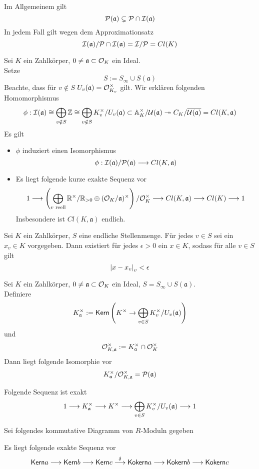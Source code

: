 \documentclass{book}
\renewcommand{\A}{\mathbb{A}}
\newcommand{\af}{\mathfrak{a}}
\begin{document}
\Bem{}
Im Allgemeinem gilt
\[ \P(\af) \subsetneq \P \cap \I(\af) \]
In jedem Fall gilt wegen dem Approximationsatz
\[ \I(\af) / \P \cap \I(\af) = \I / \P = Cl(K) \]

\Satz{}
Sei $K$ ein Zahlkörper, $0\neq \af \subset \O_K$ ein Ideal.\\
Setze
\[ S:= S_\infty \cup S(\af) \]
Beachte, dass für $v \notin S$ $U_v(\af) = \O_{K_v}^\times$ gilt. Wir erklären folgenden Homomorphismus
\begin{align*}
\phi : \I(\af) \isom{} \bigoplus_{v\notin S} \Z \isom{} \bigoplus_{v\notin S} K_v^\times / U_v(\af) \subset \A_K^\times / \U(\af) \surj{} C_K / \overline{\U(\af)} = Cl(K,\af)  
\end{align*}
Es gilt
\begin{itemize}
\item $\phi$ induziert einen Isomorphismus
\[ \phi : \I(\af) / \P(\af) \Pfeil{} Cl(K,\af) \]
\item Es liegt folgende kurze exakte Sequenz vor
\[ 1 \Pfeil{} \klam{ \bigoplus_{v \text{ reell}} \R^\times / \R_{>0} \oplus (\O_K / \af)^\times } / \O_K^\times \Pfeil{} Cl(K,\af) \Pfeil{} Cl(K) \Pfeil{} 1 \]
Insbesondere ist $Cl(K,\af)$ endlich.
\end{itemize}

Sei $K$ ein Zahlkörper, $S$ eine endliche Stellenmenge. Für jedes $v \in S$ sei ein $x_v \in K$ vorgegeben. Dann existiert für jedes $\epsilon >0$ ein $x \in K$, sodass für alle $v \in S$ gilt
\[ \left|x-x_v\right|_v < \epsilon \]

\Def{}
Sei $K$ ein Zahlkörper, $0\neq \af \subset \O_K$ ein Ideal, $S = S_\infty \cup S(\af)$.\\
Definiere
\[ K_\af^\times := \Ker\klam{ K^\times \pfeil{} \bigoplus_{v\in S } K_v^\times / U_v(\af)}  \]
und
\[\O_{K,\af}^\times := K_\af^\times \cap \O_K^\times \]
Dann liegt folgende Isomorphie vor
\[ K_\af^\times / \O_{K,\af}^\times = \P(\af) \]

\Lem{}
Folgende Sequenz ist exakt
\[ 1 \Pfeil{} K_\af^\times \Pfeil{} K^\times \Pfeil{} \bigoplus_{v\in S} K_v^\times/U_v(\af) \Pfeil{} 1 \]

Sei folgendes kommutative Diagramm von $R$-Moduln gegeben
\begin{center}
\end{center}
Es liegt folgende exakte Sequenz vor
\[ \textsf{Kern} a \overset{}{\longrightarrow} \textsf{Kern} b \overset{}{\longrightarrow} \textsf{Kern} c \overset{\delta}{\longrightarrow} \textsf{Kokern} a \overset{}{\longrightarrow} \textsf{Kokern} b \overset{}{\longrightarrow} \textsf{Kokern} c \]
\end{document}

